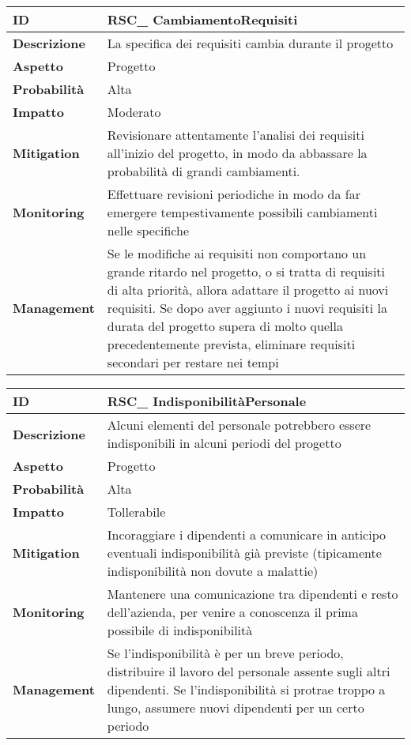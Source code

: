\begin{tabular}{|p{2.2cm}|p{9.6cm}| }
 	\hline
	\textbf{ID} & RSC\_ CambiamentoRequisiti\\ [0.5ex] 
	\hline
	\textbf{Descrizione} & La specifica dei requisiti cambia durante il progetto \\ 
	\hline
	\textbf{Aspetto} &  Progetto\\
	\hline
	\textbf{Probabilità} &  Alta \\ 
	\hline
	\textbf{Impatto} &  Moderato \\ 
	\hline
	\textbf{Mitigation} & Revisionare attentamente l'analisi dei requisiti all'inizio del progetto, in modo da abbassare la probabilità di grandi cambiamenti.\\ 
	\hline
	\textbf{Monitoring} & Effettuare revisioni periodiche in modo da far emergere tempestivamente possibili cambiamenti nelle specifiche\\ 
	\hline
	\textbf{Management} & Se le modifiche ai requisiti non comportano un grande ritardo nel progetto, o si tratta di requisiti di alta priorità, allora adattare il progetto ai nuovi requisiti. Se dopo aver aggiunto i nuovi requisiti la durata del progetto supera di molto quella precedentemente prevista, eliminare requisiti secondari per restare nei tempi \\ 
	\hline
\end{tabular}
\clearpage
\begin{tabular}{|p{2.2cm}|p{9.6cm}| }
 	\hline
	\textbf{ID} & RSC\_ IndisponibilitàPersonale\\ [0.5ex] 
	\hline
	\textbf{Descrizione} & Alcuni elementi del personale potrebbero essere indisponibili in alcuni periodi del progetto\\ 
	\hline
	\textbf{Aspetto} &  Progetto \\
	\hline
	\textbf{Probabilità} &  Alta \\ 
	\hline
	\textbf{Impatto} &  Tollerabile \\ 
	\hline
	\textbf{Mitigation} & Incoraggiare i dipendenti a comunicare in anticipo eventuali indisponibilità già previste (tipicamente indisponibilità non dovute a malattie) \\ 
	\hline
	\textbf{Monitoring} & Mantenere una comunicazione tra dipendenti e resto dell'azienda, per venire a conoscenza il prima possibile di indisponibilità\\ 
	\hline
	\textbf{Management} & Se l'indisponibilità è per un breve periodo, distribuire il lavoro del personale assente sugli altri dipendenti. Se l'indisponibilità si protrae troppo a lungo, assumere nuovi dipendenti per un certo periodo\\ 
	\hline
\end{tabular}


